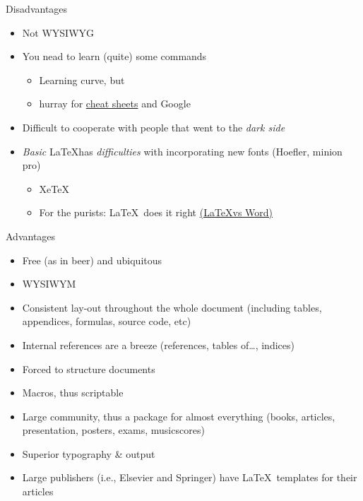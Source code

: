 \documentclass[ignorenonframetext,]{beamer}
\begin{document}
\begin{frame}{Disadvantages}

\begin{itemize}
\item
  Not WYSIWYG
\item
  You nead to learn (quite) some commands

  \begin{itemize}
  \itemsep1pt\parskip0pt
  \item
    Learning curve, but
  \item
    hurray for
    \href{https://wch.github.io/latexsheet/latexsheet.pdf}{cheat sheets}
    and Google
  \end{itemize}
\item
  Difficult to cooperate with people that went to the \emph{dark side}
\item
  \emph{Basic} \LaTeX has \emph{difficulties} with incorporating new
  fonts (Hoefler, minion pro)

  \begin{itemize}
  \itemsep1pt\parskip0pt
  \item
    XeTeX
  \item
    For the purists: \LaTeX~does it right
    \href{http://oestrem.com/thingstwice/2007/05/latex-vs-word-vs-writer/}{(\LaTeX vs
    Word)}
  \end{itemize}
\end{itemize}

\end{frame}

\begin{frame}{Advantages}

\begin{itemize}
\itemsep1pt\parskip0pt
\item
  Free (as in beer) and ubiquitous
\item
  WYSIWYM
\item
  Consistent lay-out throughout the whole document (including tables,
  appendices, formulas, source code, etc)
\item
  Internal references are a breeze (references, tables of\ldots{},
  indices)
\item
  Forced to structure documents
\item
  Macros, thus scriptable
\item
  Large community, thus a package for almost everything (books,
  articles, presentation, posters, exams, musicscores)
\item
  Superior typography \& output
\item
  Large publishers (i.e., Elsevier and Springer) have \LaTeX~templates
  for their articles
\end{itemize}

\end{frame}
\end{document}
